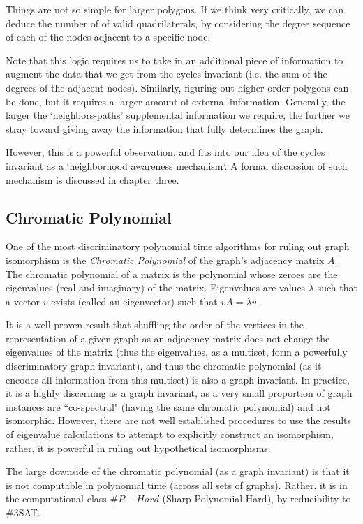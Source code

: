 Things are not so simple for larger polygons.  If we think very critically, we can deduce the number of of valid quadrilaterals, by considering the degree sequence of each of the nodes adjacent to a specific node.

Note that this logic requires us to take in an additional piece of information to augment the data that we get from the cycles invariant (i.e. the sum of the degrees of the adjacent nodes).
Similarly, figuring out higher order polygons can be done, but it requires a larger amount of external information.
Generally, the larger the `neighbors-paths' supplemental information we require, the further we stray toward giving away the information that fully determines the graph.

However, this is a powerful observation, and fits into our idea of the cycles invariant as a `neighborhood awareness mechanism'. A formal discussion of such mechanism is discussed in chapter three.

\subsection{Chromatic Polynomial}
One of the most discriminatory polynomial time algorithms for ruling out graph isomorphism is the \emph{Chromatic Polynomial} of the graph's adjacency matrix $A$.
The chromatic polynomial of a matrix is the polynomial whose zeroes are the eigenvalues (real and imaginary) of the matrix.
Eigenvalues are values $\lambda$ such that a vector $v$ exists (called an eigenvector) such that $v \dot A = \lambda v$.

It is a well proven result that shuffling the order of the vertices in the representation of a given graph as an adjacency matrix does not change the eigenvalues of the matrix (thus the eigenvalues, as a multiset, form a powerfully discriminatory graph invariant), and thus the chromatic polynomial (as it encodes all information from this multiset) is also a graph invariant.
In practice, it is a highly discerning as a graph invariant, as a very small proportion of graph instances are ``co-spectral" (having the same chromatic polynomial) and not isomorphic.
However, there are not well established procedures to use the results of eigenvalue calculations to attempt to explicitly construct an isomorphism, rather, it is powerful in ruling out hypothetical isomorphisms.

The large downside of the chromatic polynomial (as a graph invariant) is that it is not computable in polynomial time (across all sets of graphs).
Rather, it is in the computational class $\#P-Hard$ (Sharp-Polynomial Hard), by reducibility to \#3SAT.

